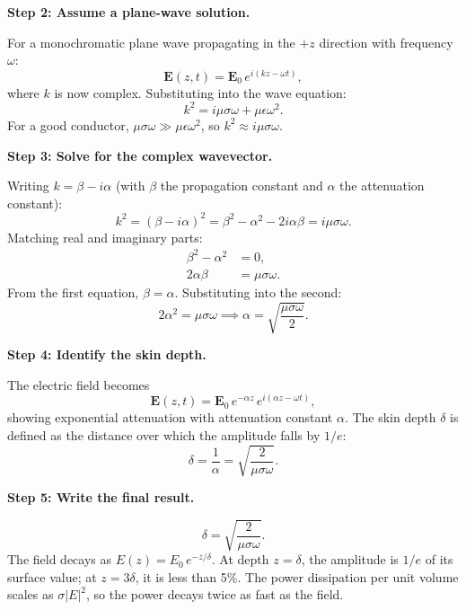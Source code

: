\textbf{Step 2: Assume a plane-wave solution.}

For a monochromatic plane wave propagating in the $+z$ direction with frequency $\omega$:
\begin{equation}
\mathbf{E}(z,t) = \mathbf{E}_0\,e^{i(kz - \omega t)},
\end{equation}
where $k$ is now complex. Substituting into the wave equation:
\begin{equation}
k^2 = i\mu\sigma\omega + \mu\epsilon\omega^2.
\end{equation}
For a good conductor, $\mu\sigma\omega \gg \mu\epsilon\omega^2$, so $k^2 \approx i\mu\sigma\omega$.

\textbf{Step 3: Solve for the complex wavevector.}

Writing $k = \beta - i\alpha$ (with $\beta$ the propagation constant and $\alpha$ the attenuation constant):
\begin{equation}
k^2 = (\beta - i\alpha)^2 = \beta^2 - \alpha^2 - 2i\alpha\beta = i\mu\sigma\omega.
\end{equation}
Matching real and imaginary parts:
\begin{align}
\beta^2 - \alpha^2 &= 0, \\
2\alpha\beta &= \mu\sigma\omega.
\end{align}
From the first equation, $\beta = \alpha$. Substituting into the second:
\begin{equation}
2\alpha^2 = \mu\sigma\omega \implies \alpha = \sqrt{\frac{\mu\sigma\omega}{2}}.
\end{equation}

\textbf{Step 4: Identify the skin depth.}

The electric field becomes
\begin{equation}
\mathbf{E}(z,t) = \mathbf{E}_0\,e^{-\alpha z}\,e^{i(\alpha z - \omega t)},
\end{equation}
showing exponential attenuation with attenuation constant $\alpha$. The skin depth $\delta$ is defined as the distance over which the amplitude falls by $1/e$:
\begin{equation}
\delta = \frac{1}{\alpha} = \sqrt{\frac{2}{\mu\sigma\omega}}.
\end{equation}

\textbf{Step 5: Write the final result.}

\begin{equation}
\boxed{\delta = \sqrt{\frac{2}{\mu\sigma\omega}}.}
\end{equation}
The field decays as $E(z) = E_0\,e^{-z/\delta}$. At depth $z = \delta$, the amplitude is $1/e$ of its surface value; at $z = 3\delta$, it is less than 5\%. The power dissipation per unit volume scales as $\sigma|E|^2$, so the power decays twice as fast as the field.

